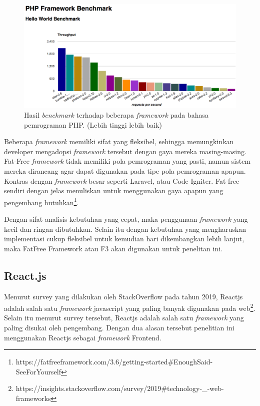 \begin{figure}[H]
    \centering
    \includegraphics[width=0.6\paperwidth]{Gambar/php-framework-benchmark-20170214.png}
    \caption{Hasil \textit{benchmark} terhadap beberapa \textit{framework} pada
        bahasa pemrograman PHP\protect\cite{kenjis:framework-benchmark}. (Lebih
        tinggi lebih baik)}
    \label{fig:chart-benchmark-php-framework}
\end{figure}

Beberapa \textit{framework} memiliki sifat yang fleksibel, sehingga memungkinkan
developer mengadopsi \textit{framework} tersebut dengan gaya mereka masing-masing.
Fat-Free \textit{framework} tidak memiliki pola pemrograman yang pasti, namun sistem
mereka dirancang agar dapat digunakan pada tipe pola pemrograman apapun. Kontras
dengan \textit{framework} besar seperti Laravel, atau Code Igniter. Fat-free sendiri
dengan jelas menuliskan untuk menggunakan gaya apapun yang pengembang
butuhkan\footnote{https://fatfreeframework.com/3.6/getting-started\#EnoughSaid-SeeForYourself}.
 
Dengan sifat analisis kebutuhan yang cepat, maka penggunaan \textit{framework} yang kecil
dan ringan dibutuhkan. Selain itu dengan kebutuhan yang mengharuskan
implementasi cukup fleksibel untuk kemudian hari dikembangkan lebih lanjut, maka
FatFree Framework atau F3 akan digunakan untuk penelitan ini.

\subsection{React.js}
    Menurut survey yang dilakukan oleh StackOverflow pada tahun 2019, Reactjs
    adalah salah satu \textit{framework} javascript yang paling banyak digunakan
    pada
    web\footnote{https://insights.stackoverflow.com/survey/2019{\#}technology-{\_}-web-frameworks}.
    Selain itu menurut survey tersebut, Reactjs adalah salah satu \textit{framework} yang
    paling disukai oleh pengembang. Dengan dua alasan tersebut penelitian ini
    menggunakan Reactjs sebagai \textit{framework} Frontend.

